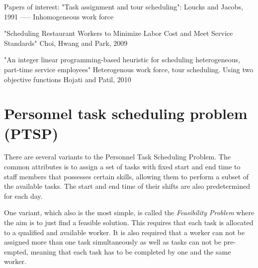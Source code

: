 Papers of interest:
"Task assignment and tour scheduling": Loucks and Jacobs, 1991
----- Inhomogeneous work force

"Scheduling Restaurant Workers to Minimize Labor Cost and Meet Service Standards" Choi, Hwang and Park, 2009

"An integer linear programming-based heuristic for scheduling heterogeneous, part-time service employees" Heterogenous work force, tour scheduling. Using two objective functions Hojati and Patil, 2010


\section{Personnel task scheduling problem (PTSP)} \label{PTSP}
There are several variants to the Personnel Task Scheduling Problem. The common attributes is to assign a set of tasks with fixed start and end time to staff members that possesses certain skills, allowing them to perform a subset of the available tasks. The start and end time of their shifts are also predetermined for each day.

One variant, which also is the most simple, is called the \textit{Feasibility Problem} where the aim is to just find a feasible solution. This requires that each task is allocated to a qualified and available worker. It is also required that a worker can not be assigned more than one task simultaneously as well as tasks can not be pre-empted, meaning that each task has to be completed by one and the same worker.

